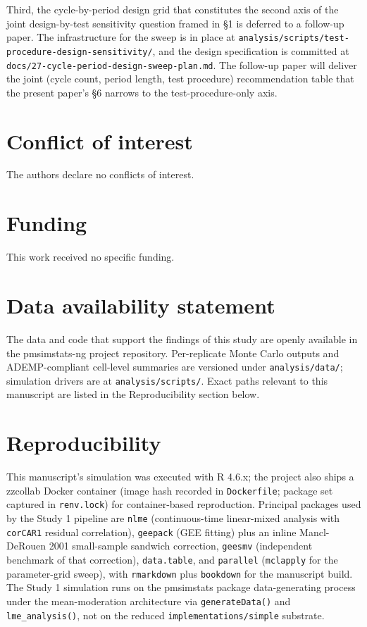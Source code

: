 \documentclass[
  11pt,
]{article}
\begin{document}
Third, the cycle-by-period design grid that constitutes the
second axis of the joint design-by-test sensitivity question
framed in \S1 is deferred to a follow-up paper. The
infrastructure for the sweep is in place at
\texttt{analysis/scripts/test-procedure-design-sensitivity/}, and the
design specification is committed at
\texttt{docs/27-cycle-period-design-sweep-plan.md}. The follow-up paper
will deliver the joint (cycle count, period length, test
procedure) recommendation table that the present paper's \S6
narrows to the test-procedure-only axis.

\section{Conflict of interest}\label{conflict-of-interest}

The authors declare no conflicts of interest.

\section{Funding}\label{funding}

This work received no specific funding.

\section{Data availability statement}\label{data-availability-statement}

The data and code that support the findings of this study are
openly available in the pmsimstats-ng project repository.
Per-replicate Monte Carlo outputs and ADEMP-compliant cell-level
summaries are versioned under \texttt{analysis/data/}; simulation
drivers are at \texttt{analysis/scripts/}. Exact paths relevant to this
manuscript are listed in the Reproducibility section below.

\section{Reproducibility}\label{reproducibility}

This manuscript's simulation was executed with R 4.6.x; the
project also ships a zzcollab Docker container (image hash
recorded in \texttt{Dockerfile}; package set captured in \texttt{renv.lock})
for container-based reproduction. Principal packages used by the
Study 1 pipeline are \texttt{nlme} (continuous-time linear-mixed
analysis with \texttt{corCAR1} residual correlation), \texttt{geepack} (GEE
fitting) plus an inline Mancl-DeRouen 2001 small-sample sandwich
correction, \texttt{geesmv} (independent benchmark of that correction),
\texttt{data.table}, and \texttt{parallel} (\texttt{mclapply} for the parameter-grid
sweep), with \texttt{rmarkdown} plus \texttt{bookdown} for the manuscript
build. The Study 1 simulation runs on the pmsimstats package
data-generating process under the mean-moderation architecture via \texttt{generateData()}
and \texttt{lme\_analysis()}, not on the reduced
\texttt{implementations/simple} substrate.
\end{document}
